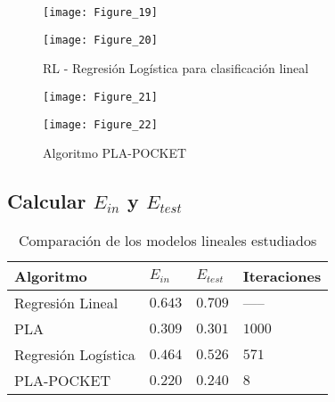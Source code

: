 \begin{figure}[H]
    \caption{RL - Regresión Logística para clasificación lineal\medskip}
    \begin{minipage}[b]{.5\linewidth}
      \centering
      \texttt{[image: Figure\_19]}
       \label{subfig-5:dummy64}
    \end{minipage}
    \hfill \hfill
    \begin{minipage}[b]{.5\linewidth}
      \centering
      \texttt{[image: Figure\_20]}
    \end{minipage}
    \label{fig:dummy64}
\end{figure}

\begin{figure}[H]
    \caption{Algoritmo PLA-POCKET \medskip}
    \begin{minipage}[b]{.5\linewidth}
      \centering
      \texttt{[image: Figure\_21]}
       \label{subfig-5:dummy65}
    \end{minipage}
    \hfill \hfill
    \begin{minipage}[b]{.5\linewidth}
      \centering
      \texttt{[image: Figure\_22]}
    \end{minipage}
    \label{fig:dummy65}
\end{figure}

\subsection{Calcular $E_{in}$ y $E_{test}$}

\begin{table}[H]
    \centering
    \begin{tabular}{llll} \toprule
        Algoritmo & $E_{in}$ & $E_{test}$ & Iteraciones \\ \midrule
        Regresión Lineal& $0.643$ & $0.709$ & ----- \\ 
        PLA & $0.309$ & $0.301$ & $1000$ \\ 
        Regresión Logística & $0.464$ & $0.526$ & $571$ \\ 
        PLA-POCKET & $0.220$ & $0.240$ & $8$ \\ \bottomrule
    \end{tabular}
    \caption{Comparación de los modelos lineales estudiados}
\end{table}

